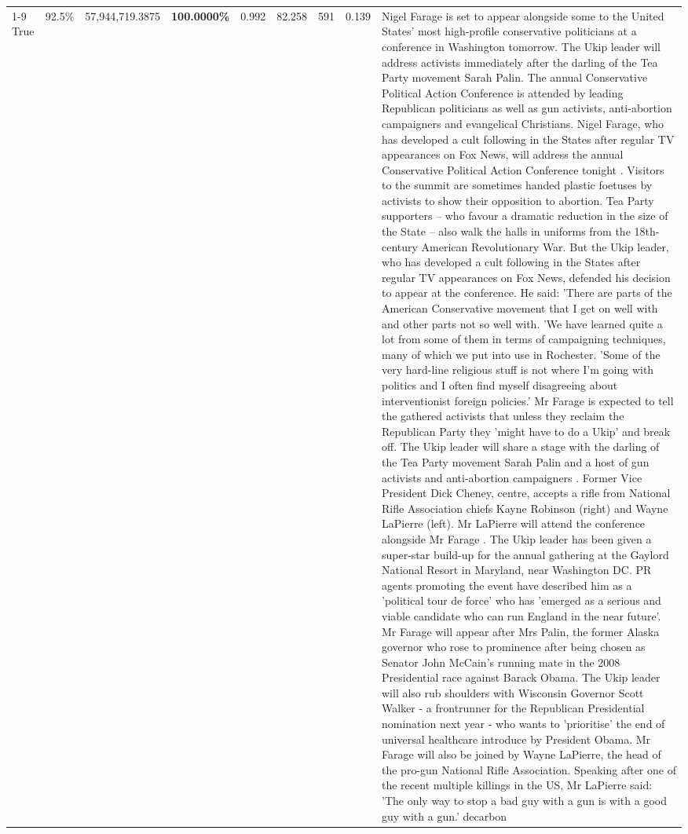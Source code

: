 \begin{table}[H]
\begin{tabular}{lllrlllll}
\cline{1-9} \cline{2-9}
True & 92.5\% & 57,944,719.3875 & \bfseries \color{red} 100.0000\% & 0.992 & 82.258 & 591 & 0.139 & Nigel Farage is set to appear alongside some to the United States' most high-profile conservative politicians at a conference in Washington tomorrow. The Ukip leader will address activists immediately after the darling of the Tea Party movement Sarah Palin. The annual Conservative Political Action Conference is attended by leading Republican politicians as well as gun activists, anti-abortion campaigners and evangelical Christians. Nigel Farage, who has developed a cult following in the States after regular TV appearances on Fox News, will address the annual Conservative Political Action Conference tonight . Visitors to the summit are sometimes handed plastic foetuses by activists to show their opposition to abortion. Tea Party supporters – who favour a dramatic reduction in the size of the State – also walk the halls in uniforms from the 18th-century American Revolutionary War. But the Ukip leader, who has developed a cult following in the States after regular TV appearances on Fox News, defended his decision to appear at the conference. He said: 'There are parts of the American Conservative movement that I get on well with and other parts not so well with. 'We have learned quite a lot from some of them in terms of campaigning techniques, many of which we put into use in Rochester. 'Some of the very hard-line religious stuff is not where I'm going with politics and I often find myself disagreeing about interventionist foreign policies.' Mr Farage is expected to tell the gathered activists that unless they reclaim the Republican Party they 'might have to do a Ukip' and break off. The Ukip leader will share a stage with the darling of the Tea Party movement Sarah Palin and a host of gun activists and anti-abortion campaigners . Former Vice President Dick Cheney, centre, accepts a rifle from National Rifle Association chiefs Kayne Robinson (right) and Wayne LaPierre (left). Mr LaPierre will attend the conference alongside Mr Farage . The Ukip leader has been given a super-star build-up for the annual gathering at the Gaylord National Resort in Maryland, near Washington DC. PR agents promoting the event have described him as a 'political tour de force' who has 'emerged as a serious and viable candidate who can run England in the near future'. Mr Farage will appear after Mrs Palin, the former Alaska governor who rose to prominence after being chosen as Senator John McCain's running mate in the 2008 Presidential race against Barack Obama. The Ukip leader will also rub shoulders with Wisconsin Governor Scott Walker - a frontrunner for the Republican Presidential nomination next year - who wants to 'prioritise' the end of universal healthcare introduce by President Obama. Mr Farage will also be joined by Wayne LaPierre, the head of the pro-gun National Rifle Association. Speaking after one of the recent multiple killings in the US, Mr LaPierre said: 'The only way to stop a bad guy with a gun is with a good guy with a gun.' decarbon \\

\end{tabular}
\end{table}

